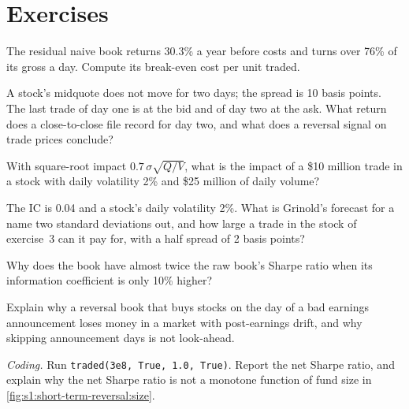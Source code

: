 \section{Exercises}

\begin{exercise}[$\star$]\label{exo:s1:short-term-reversal:1}
The residual naive book returns 30.3\% a year before costs and turns over 76\% of its gross a day. Compute its break-even cost per unit traded.
\end{exercise}

\begin{exercise}[$\star$]\label{exo:s1:short-term-reversal:2}
A stock's midquote does not move for two days; the spread is 10 basis points. The last trade of day one is at the bid and of day two at the ask. What return
does a close-to-close file record for day two, and what does a reversal signal on trade prices conclude?
\end{exercise}

\begin{exercise}[$\star$]\label{exo:s1:short-term-reversal:3}
With square-root impact $0.7\,\sigma\sqrt{Q/V}$, what is the impact of a \$10 million trade in a stock with daily volatility 2\% and \$25 million of daily volume?
\end{exercise}

\begin{exercise}[$\star\star$]\label{exo:s1:short-term-reversal:4}
The IC is 0.04 and a stock's daily volatility 2\%. What is Grinold's forecast for a name two standard deviations out, and how large a trade in the stock of
exercise~3 can it pay for, with a half spread of 2 basis points?
\end{exercise}

\begin{exercise}[$\star\star$]\label{exo:s1:short-term-reversal:5}
Why does the  book have almost twice the raw book's Sharpe ratio when its information coefficient is only 10\% higher?
\end{exercise}

\begin{exercise}[$\star\star$]\label{exo:s1:short-term-reversal:6}
Explain why a reversal book that buys stocks on the day of a bad earnings announcement loses money in a market with post-earnings drift, and why skipping
announcement days is not look-ahead.
\end{exercise}

\begin{exercise}[$\star\star\star$]\label{exo:s1:short-term-reversal:7}
\emph{Coding.} Run \texttt{traded(3e8, True, 1.0, True)}. Report the net Sharpe ratio, and explain why the net Sharpe ratio is not a monotone function of fund
size in \cref{fig:s1:short-term-reversal:size}.
\end{exercise}

